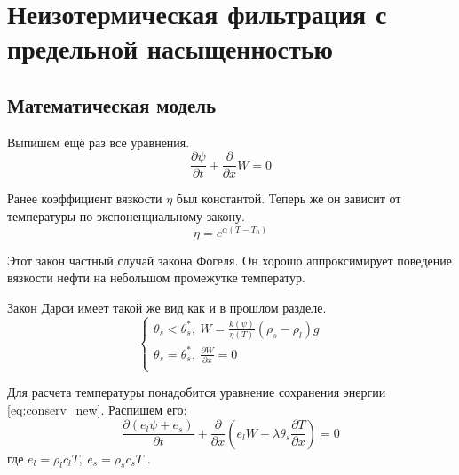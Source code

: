 \documentclass[12pt,a4paper]{article}
\newcommand{\pd}[2]{\frac{\partial #1}{\partial #2}}
\begin{document}
\section{Неизотермическая фильтрация с предельной насыщенностью}
\subsection{Математическая модель}

Выпишем ещё раз все уравнения.
$$
\pd{\psi}{t} + \pd{}{x}W = 0
$$

Ранее коэффициент вязкости $\eta$ был константой. Теперь же он зависит от температуры по экспоненциальному закону.
\begin{equation}
\eta = e^{\alpha(T - T_{0})}
\label{viscos}
\end{equation}

Этот закон частный случай закона Фогеля. Он хорошо аппроксимирует поведение вязкости нефти на небольшом промежутке температур.

Закон Дарси имеет такой же вид как и в прошлом разделе.
$$
\begin{cases}
\theta_s < \theta_s^*,\  W = \frac{k(\psi)}{\eta(T)} (\rho_s - \rho_l) g\\
\theta_s = \theta_s^*,\  \pd{W}{x} = 0\\
\end{cases}
$$

Для расчета температуры понадобится уравнение сохранения энергии \eqref{eq:conserv_new}. Распишем его:	
$$
\pd{(e_l\psi+e_s)}{t} + \pd{}{x}(e_l W - \lambda\theta_s\pd{T}{x}) = 0
$$
где $ e_l = \rho_l c_l T,\ e_s = \rho_s c_s T $ .
\end{document}
